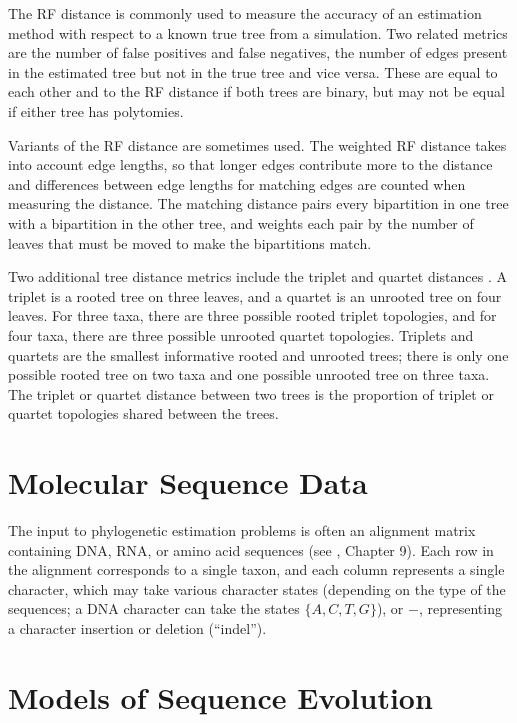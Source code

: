 \documentclass[tocnosub,noragright,centerchapter,fullpagesingle,12pt]{uiuc_csthesis18}
\begin{document}
The RF distance is commonly used to measure the accuracy of an
estimation method with respect to a known true tree from a
simulation. Two related metrics are the number of false positives and false negatives, the number of edges present in the estimated tree but not in the true tree and vice versa. These are equal to each other and to the RF distance if both trees are binary, but may not be equal if either tree has polytomies.

Variants of the RF distance are sometimes used. The weighted RF distance \cite{robinson1979comparison} takes into account edge lengths, so that longer edges contribute more to the distance and differences between edge lengths for matching edges are counted when measuring the distance. The matching distance \cite{lin2012metric} pairs every bipartition in one tree with a bipartition in the other tree, and weights each pair by the number of leaves that must be moved to make the bipartitions match.

Two additional tree distance metrics include the triplet and
quartet distances \cite{bansal2008comparing, critchlow1996triples, mirarab2015astral, sand2014tqdist}. A triplet is a rooted tree on three leaves, and a
quartet is an unrooted tree on four leaves. For three taxa, there are
three possible rooted triplet topologies, and for four taxa, there are
three possible unrooted quartet topologies. Triplets and quartets are
the smallest informative rooted and unrooted trees; there is only one
possible rooted tree on two taxa and one possible unrooted tree on
three taxa. The triplet or quartet distance between two trees is the
proportion of triplet or quartet topologies shared between the trees.

\section{Molecular Sequence Data}

The input to phylogenetic estimation problems is often an alignment
matrix containing DNA, RNA, or amino acid sequences (see \cite{warnow2017computational}, Chapter 9). Each row in the
alignment corresponds to a single taxon, and each column represents a
single character, which may take various character states (depending
on the type of the sequences; a DNA character can take the states
$\{A,C,T,G\}$), or $-$, representing a character insertion or deletion
(``indel''). 

\section{Models of Sequence Evolution}
\label{section:simple-model}
\end{document}
